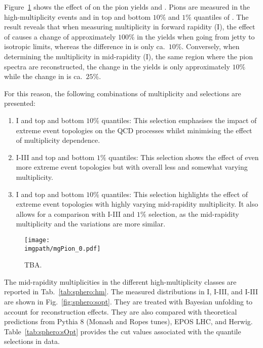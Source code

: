 Figure~\ref{fig:sphero:v0mvscl1} shows the effect of \SOPT on the pion yields and \meanpt. Pions are measured in the high-multiplicity events and in top and bottom $10\%$ and $1\%$ quantiles of \SOPT. The result reveals that when measuring multiplicity in forward rapidity (\VOM I), the effect of \SOPT causes a change of approximately $100\%$ in the yields when going from jetty to isotropic limits, whereas the difference in \meanpt is only ca.\ $10\%$. Conversely, when determining the multiplicity in mid-rapidity (\NSPD I), the same region where the pion spectra are reconstructed, the change in the yields is only approximately $10\%$ while the change in \meanpt is ca.\ $25\%$.

For this reason, the following combinations of multiplicity and \SOPT selections are presented:
\begin{enumerate}
\item \NSPD I and \SOPT top and bottom $10\%$ quantiles: This selection emphasises the impact of extreme event topologies on the QCD processes whilst minimising the effect of multiplicity dependence.
\item \NSPD I-III and \SOPT top and bottom $1\%$ quantiles: This selection shows the effect of even more extreme event topologies but with overall less and somewhat varying multiplicity. 
\item \VOM I and \SOPT top and bottom $10\%$ quantiles: This selection highlights the effect of extreme event topologies with highly varying mid-rapidity multiplicity. It also allows for a comparison with \NSPD I-III and \SOPT $1\%$ selection, as the mid-rapidity multiplicity and the \meanpt variations are more similar.
\end{enumerate}

\begin{figure}%
\texttt{[image: \\imgpath/mgPion\_0.pdf]}
\caption{TBA.}
\label{fig:sphero:v0mvscl1}
\end{figure}

The mid-rapidity multiplicities in the different high-multiplicity classes are reported in Tab.~\ref{tab:sphero:hm}. The measured \SOPT distributions in \NSPD I, \NSPD I-III, and \VOM I-III are shown in Fig.~\ref{fig:sphero:sopt}. They are treated with Bayesian unfolding to account for reconstruction effects. They are also compared with theoretical predictions from Pythia 8 (Monash and Ropes tunes), EPOS LHC, and Herwig. Table~\ref{tab:sphero:sOpt} provides the \SOPT cut values associated with the quantile selections in data.

